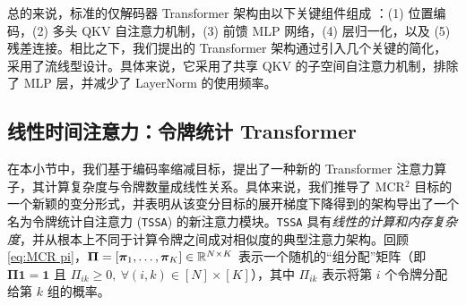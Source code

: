 \documentclass[../../book-main_zh.tex]{subfiles}
\begin{document}
总的来说，标准的仅解码器 Transformer 架构由以下关键组件组成 \cite{vaswani2017attention}：(1) 位置编码，(2) 多头 QKV 自注意力机制，(3) 前馈 MLP 网络，(4) 层归一化，以及 (5) 残差连接。相比之下，我们提出的 Transformer 架构通过引入几个关键的简化，采用了流线型设计。具体来说，它采用了共享 QKV 的子空间自注意力机制，排除了 MLP 层，并减少了 LayerNorm 的使用频率。










\subsection{线性时间注意力：令牌统计 Transformer}\label{sub:tost}

在本小节中，我们基于编码率缩减目标，提出了一种新的 Transformer 注意力算子，其计算复杂度与令牌数量成线性关系。具体来说，我们推导了 MCR$^2$ 目标的一个新颖的变分形式，并表明从该变分目标的展开梯度下降得到的架构导出了一个名为令牌统计自注意力 (\texttt{TSSA}) 的新注意力模块。\texttt{TSSA} 具有{\em 线性的计算和内存复杂度}，并从根本上不同于计算令牌之间成对相似度的典型注意力架构。回顾 \eqref{eq:MCR pi}，$\bm \Pi = [\bm \pi_1, \ldots, \bm \pi_K] \in \mathbb{R}^{N \times K}$ 表示一个随机的“组分配”矩阵（即 $\bm \Pi \bm 1 = \bm 1$ 且 $\Pi_{ik} \geq 0, \  \forall (i,k) \in [N] \times [K]$），其中 $\Pi_{ik}$ 表示将第 $i$ 个令牌分配给第 $k$ 组的概率。

\end{document}
